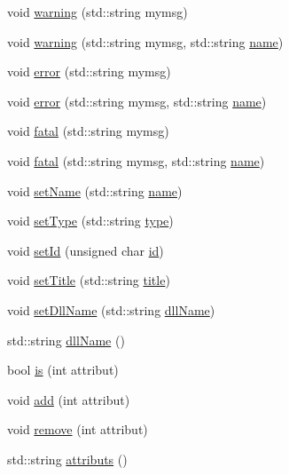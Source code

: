 \begin{DoxyCompactItemize}
\item 
void \hyperlink{classObject_a65cd4fda577711660821fd2cd5a3b4c9}{warning} (std\+::string mymsg)
\item 
void \hyperlink{classObject_a11f101db4dd73d9391b0231818881d86}{warning} (std\+::string mymsg, std\+::string \hyperlink{classObject_a300f4c05dd468c7bb8b3c968868443c1}{name})
\item 
void \hyperlink{classObject_a204a95f57818c0f811933917a30eff45}{error} (std\+::string mymsg)
\item 
void \hyperlink{classObject_ad7f6c457733082efa2f9ff5f5c8e119a}{error} (std\+::string mymsg, std\+::string \hyperlink{classObject_a300f4c05dd468c7bb8b3c968868443c1}{name})
\item 
void \hyperlink{classObject_aad5a16aac7516ce65bd5ec02ab07fc80}{fatal} (std\+::string mymsg)
\item 
void \hyperlink{classObject_ae62acd3d09f716220f75f252dc38bc9a}{fatal} (std\+::string mymsg, std\+::string \hyperlink{classObject_a300f4c05dd468c7bb8b3c968868443c1}{name})
\item 
void \hyperlink{classObject_ae30fea75683c2d149b6b6d17c09ecd0c}{set\+Name} (std\+::string \hyperlink{classObject_a300f4c05dd468c7bb8b3c968868443c1}{name})
\item 
void \hyperlink{classObject_aae534cc9d982bcb9b99fd505f2e103a5}{set\+Type} (std\+::string \hyperlink{classObject_a84f99f70f144a83e1582d1d0f84e4e62}{type})
\item 
void \hyperlink{classObject_a398fe08cba594a0ce6891d59fe4f159f}{set\+Id} (unsigned char \hyperlink{classObject_af99145335cc61ff6e2798ea17db009d2}{id})
\item 
void \hyperlink{classObject_a89557dbbad5bcaa02652f5d7fa35d20f}{set\+Title} (std\+::string \hyperlink{classObject_a73a0f1a41828fdd8303dd662446fb6c3}{title})
\item 
void \hyperlink{classObject_a870c5af919958c2136623b2d7816d123}{set\+Dll\+Name} (std\+::string \hyperlink{classObject_a2e3947f2870094c332d7454117f3ec63}{dll\+Name})
\item 
std\+::string \hyperlink{classObject_a2e3947f2870094c332d7454117f3ec63}{dll\+Name} ()
\item 
bool \hyperlink{classAttrib_a704f26af560909ad22065083bb7d4c34}{is} (int attribut)
\item 
void \hyperlink{classAttrib_a235f773af19c900264a190b00a3b4ad7}{add} (int attribut)
\item 
void \hyperlink{classAttrib_a7d4ef7e32d93cb287792b87b857e79f3}{remove} (int attribut)
\item 
std\+::string \hyperlink{classAttrib_aee7bbf16b144887f196e1341b24f8a26}{attributs} ()
\end{DoxyCompactItemize}
